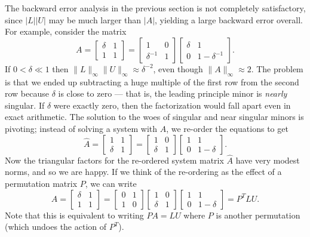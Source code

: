 \documentclass[12pt, leqno]{article} %
\begin{document}
The backward error analysis in the previous section is not completely
satisfactory, since $|L| |U|$ may be much larger than $|A|$, yielding
a large backward error overall.  For example, consider the matrix
\[
  A = \begin{bmatrix} \delta & 1 \\ 1 & 1 \end{bmatrix} =
      \begin{bmatrix} 1 & 0 \\ \delta^{-1} & 1 \end{bmatrix}
      \begin{bmatrix} \delta & 1 \\ 0 & 1-\delta^{-1} \end{bmatrix}.
\]
If $0 < \delta \ll 1$ then $\|L\|_{\infty} \|U\|_{\infty} \approx
\delta^{-2}$, even though $\|A\|_{\infty} \approx 2$.  The problem is
that we ended up subtracting a huge multiple of the first row from the
second row because $\delta$ is close to zero --- that is, the leading
principle minor is {\em nearly} singular.  If $\delta$ were exactly
zero, then the factorization would fall apart even in exact
arithmetic.  The solution to the woes of singular and near singular minors
is pivoting; instead of solving a system with $A$, we re-order the
equations to get
\[
  \hat{A} =
      \begin{bmatrix} 1 & 1 \\ \delta & 1 \end{bmatrix} =
      \begin{bmatrix} 1 & 0 \\ \delta & 1 \end{bmatrix}
      \begin{bmatrix} 1 & 1 \\ 0 & 1-\delta \end{bmatrix}.
\]
Now the triangular factors for the re-ordered system matrix $\hat{A}$
have very modest norms, and so we are happy.  If we think of the re-ordering
as the effect of a permutation matrix $P$, we can write
\[
  A = \begin{bmatrix} \delta & 1 \\ 1 & 1 \end{bmatrix} =
      \begin{bmatrix} 0 & 1 \\ 1 & 0 \end{bmatrix}
      \begin{bmatrix} 1 & 0 \\ \delta & 1 \end{bmatrix}
      \begin{bmatrix} 1 & 1 \\ 0 & 1-\delta \end{bmatrix}
    = P^T LU.
\]
Note that this is equivalent to writing $P A = LU$ where $P$
is another permutation (which undoes the action of $P^T$).
\end{document}
